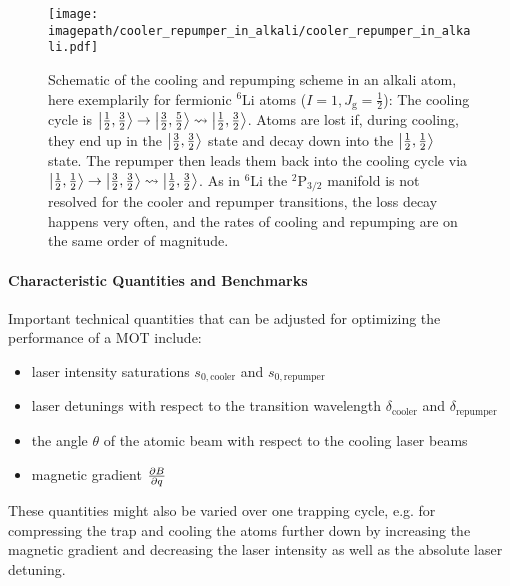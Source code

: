 \begin{figure}
    \centering
    \texttt{[image: \\imagepath/cooler\_repumper\_in\_alkali/cooler\_repumper\_in\_alkali.pdf]}
    \caption{Schematic of the cooling and repumping scheme in an alkali atom, here exemplarily for fermionic $^6$Li atoms ($I = 1, J_\text{g} = \frac{1}{2}$): The cooling cycle is $\Ket{\frac{1}{2}, \frac{3}{2}} \rightarrow \Ket{\frac{3}{2}, \frac{5}{2}} \rightsquigarrow \Ket{\frac{1}{2}, \frac{3}{2}}$. Atoms are lost if, during cooling, they end up in the $\Ket{\frac{3}{2}, \frac{3}{2}}$ state and decay down into the $\Ket{\frac{1}{2}, \frac{1}{2}}$ state. The repumper then leads them back into the cooling cycle via $\Ket{\frac{1}{2}, \frac{1}{2}} \rightarrow \Ket{\frac{3}{2}, \frac{3}{2}} \rightsquigarrow \Ket{\frac{1}{2}, \frac{3}{2}}$. As in $^6$Li the $^2\text{P}_{3/2}$ manifold is not resolved for the cooler and repumper transitions, the loss decay happens very often, and the rates of cooling and repumping are on the same order of magnitude.}
    \label{fig:cooler_repumper_in_alkali}
\end{figure}

\paragraph{Characteristic Quantities and Benchmarks}
Important technical quantities that can be adjusted for optimizing the performance of a MOT include:
\begin{itemize}
    \item laser intensity saturations $s_{0, \text{cooler}}$ and $s_{0, \text{repumper}}$
    \item laser detunings with respect to the transition wavelength $\delta_\text{cooler}$ and $\delta_\text{repumper}$
    \item the angle $\theta$ of the atomic beam with respect to the cooling laser beams
    \item magnetic gradient $\pdv{B}{q}$
\end{itemize}

These quantities might also be varied over one trapping cycle, e.g. for compressing the trap and cooling the atoms further down by increasing the magnetic gradient and decreasing the laser intensity as well as the absolute laser detuning.

